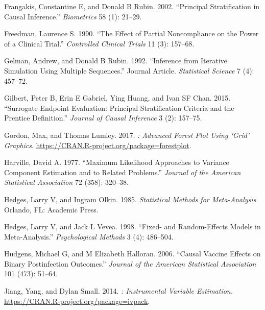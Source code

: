 \begin{CSLReferences}{1}{0}
\leavevmode{}%
Frangakis, Constantine E, and Donald B Rubin. 2002. {``Principal Stratification in Causal Inference.''} \emph{Biometrics} 58 (1): 21--29.

\leavevmode{}%
Freedman, Laurence S. 1990. {``The Effect of Partial Noncompliance on the Power of a Clinical Trial.''} \emph{Controlled Clinical Trials} 11 (3): 157--68.

\leavevmode{}%
Gelman, Andrew, and Donald B Rubin. 1992. {``Inference from Iterative Simulation Using Multiple Sequences.''} Journal Article. \emph{Statistical Science} 7 (4): 457--72.

\leavevmode{}%
Gilbert, Peter B, Erin E Gabriel, Ying Huang, and Ivan SF Chan. 2015. {``Surrogate Endpoint Evaluation: Principal Stratification Criteria and the Prentice Definition.''} \emph{Journal of Causal Inference} 3 (2): 157--75.

\leavevmode{}%
Gordon, Max, and Thomas Lumley. 2017. \emph{: Advanced Forest Plot Using {`Grid'} Graphics}. \url{https://CRAN.R-project.org/package=forestplot}.

\leavevmode{}%
Harville, David A. 1977. {``Maximum Likelihood Approaches to Variance Component Estimation and to Related Problems.''} \emph{Journal of the American Statistical Association} 72 (358): 320--38.

\leavevmode{}%
Hedges, Larry V, and Ingram Olkin. 1985. \emph{Statistical Methods for Meta-Analysis}. Orlando, FL: Academic Press.

\leavevmode{}%
Hedges, Larry V, and Jack L Vevea. 1998. {``Fixed- and Random-Effects Models in Meta-Analysis.''} \emph{Psychological Methods} 3 (4): 486--504.

\leavevmode{}%
Hudgens, Michael G, and M Elizabeth Halloran. 2006. {``Causal Vaccine Effects on Binary Postinfection Outcomes.''} \emph{Journal of the American Statistical Association} 101 (473): 51--64.

\leavevmode{}%
Jiang, Yang, and Dylan Small. 2014. \emph{: Instrumental Variable Estimation.} \url{https://CRAN.R-project.org/package=ivpack}.


\end{CSLReferences}
